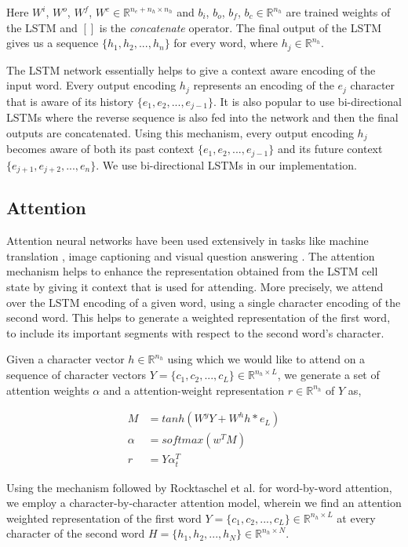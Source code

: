 Here $W^i$, $W^o$, $W^f$, $W^c \in  \mathbb{R}^{n_e+n_h \times n_h}$ and $b_i$, $b_o$, $b_f$, $b_c \in \mathbb{R}^{n_h}$ are trained weights of the LSTM and $[]$ is the \textit{concatenate} operator. The final output of the LSTM gives us a sequence $\{h_1, h_2, ..., h_n\}$ for every word, where $h_j \in \mathbb{R}^{n_h}$.

The LSTM network essentially helps to give a context aware encoding of the input word. Every output encoding $h_j$ represents an encoding of the $e_j$ character that is aware of its history $\{e_1, e_2, ..., e_{j-1}\}$. It is also popular to use bi-directional LSTMs where the reverse sequence is also fed into the network and then the final outputs are concatenated. Using this mechanism, every output encoding $h_j$ becomes aware of both its past context $\{e_1, e_2, ..., e_{j-1}\}$ and its future context $\{e_{j+1}, e_{j+2}, ..., e_n\}$. We use bi-directional LSTMs in our implementation.

\subsection{Attention}

Attention neural networks have been used extensively in tasks like machine translation \citep{mtattention}, image captioning \citep{cpattention} and visual question answering \citep{stackedattention}. The attention mechanism helps to enhance the representation obtained from the LSTM cell state by giving it context that is used for attending. More precisely, we attend over the LSTM encoding of a given word, using a single character encoding of the second word. This helps to generate a weighted representation of the first word, to include its important segments with respect to the second word's character. 

Given a character vector $h \in  \mathbb{R}^{n_h}$ using which we would like to attend on a sequence of character vectors $Y = \{c_1, c_2, ..., c_L\} \in \mathbb{R}^{n_h \times L}$, we generate a set of attention weights $\alpha$ and a attention-weight representation $r \in  \mathbb{R}^{n_h}$ of $Y$ as,

\begin{align}
M &= tanh(W^yY + W^hh*e_L) \\
\alpha &= softmax(w^TM) \\
r &= Y\alpha_t^T
\end{align}

Using the mechanism followed by Rocktaschel et al.\citep{rocktaschel2016reasoning} for word-by-word attention, we employ a character-by-character attention model, wherein we find an attention weighted representation of the first word $Y = \{c_1, c_2, ..., c_L\} \in \mathbb{R}^{n_h \times L}$ at every character of the second word $H = \{h_1, h_2, ..., h_N\} \in \mathbb{R}^{n_h \times N}$.

